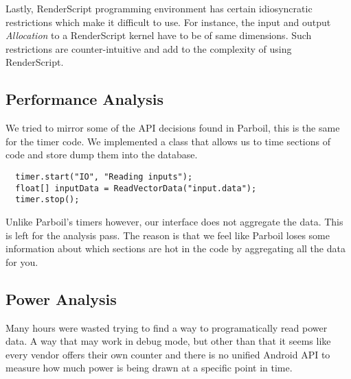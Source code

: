 Lastly, RenderScript programming environment has certain idiosyncratic
restrictions which make it difficult to use. For instance, the input and output
{\em Allocation} to a RenderScript kernel have to be of same dimensions. Such
restrictions are counter-intuitive and add to the complexity of using
RenderScript.

\subsection*{Performance Analysis}

We tried to mirror some of the API decisions found in Parboil, this is the same for the timer code.
We implemented a class that allows us to time sections of code and store dump them into the database.

\begin{verbatim}
  timer.start("IO", "Reading inputs");
  float[] inputData = ReadVectorData("input.data");
  timer.stop();
\end{verbatim}

Unlike Parboil's timers however, our interface does not aggregate the data.
This is left for the analysis pass.
The reason is that we feel like Parboil loses some information about which sections are hot in the
  code by aggregating all the data for you.

\subsection*{Power Analysis}

Many hours were wasted trying to find a way to programatically read power data.
A way that may work in debug mode, but other than that it seems like every vendor offers their own
  counter and there is no unified Android API to measure how much power is being drawn at a 
  specific point in time.
